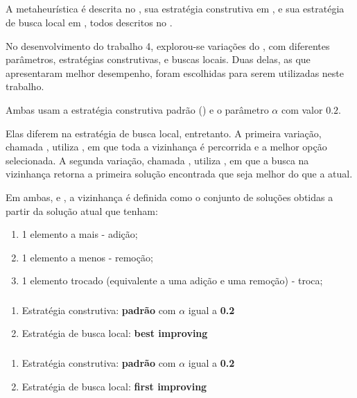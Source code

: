 \subsection{\grasp}
\label{subsection:grasp}

A metaheurística \grasp é descrita no , sua estratégia construtiva em , e sua estratégia de busca local em , todos descritos no .

No desenvolvimento do trabalho 4, explorou-se variações do \grasp, com diferentes parâmetros, estratégias construtivas, e buscas locais. Duas delas, as que apresentaram melhor desempenho, foram escolhidas para serem utilizadas neste trabalho.

Ambas usam a estratégia construtiva padrão () e o parâmetro $\alpha$ com valor $0.2$.

Elas diferem na estratégia de busca local, entretanto. A primeira variação, chamada \graspBest, utiliza \bestImproving, em que toda a vizinhança é percorrida e a melhor opção selecionada. A segunda variação, chamada \graspFirst, utiliza \firstImproving, em que a busca na vizinhança retorna a primeira solução encontrada que seja melhor do que a atual.

Em ambas, \bestImproving e \firstImproving, a vizinhança é definida como o conjunto de soluções obtidas a partir da solução atual que tenham:

\begin{enumerate}
    \item 1 elemento a mais - adição;
    \item 1 elemento a menos - remoção;
    \item 1 elemento trocado (equivalente a uma adição e uma remoção) - troca;
\end{enumerate}

\subsubsection{\graspBest}
\label{subsubsection:grasp-best}

\begin{enumerate}
    \item Estratégia construtiva: \textbf{padrão} com $\alpha$ igual a \textbf{0.2}
    \item Estratégia de busca local: \textbf{best improving}
\end{enumerate}

\subsubsection{\graspFirst}
\label{subsubsection:grasp-first}

\begin{enumerate}
    \item Estratégia construtiva: \textbf{padrão} com $\alpha$ igual a \textbf{0.2}
    \item Estratégia de busca local: \textbf{first improving}
\end{enumerate}
